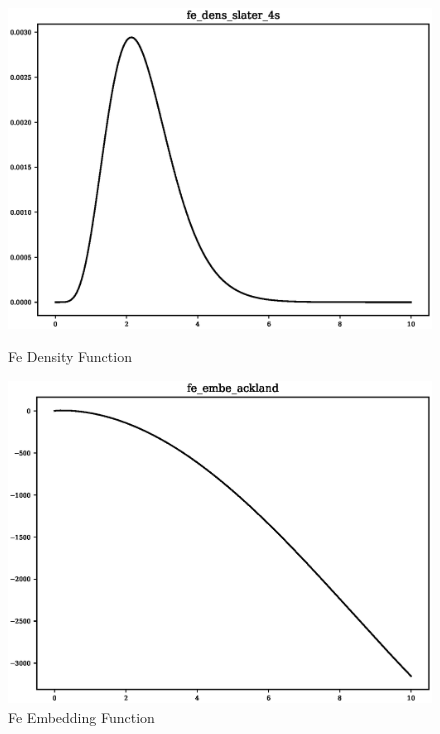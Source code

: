\begin{figure}[ht]
\begin{minipage}[b]{0.5\linewidth}
    \includegraphics[width=.9\linewidth]{chapters/results_potential_fitting/pot_fepd_fcc_2/fe_dens_slater_4s.eps} 
    \caption{Fe Density Function} 
  \end{minipage}%
  \begin{minipage}[b]{0.5\linewidth}
    \centering
    \includegraphics[width=.9\linewidth]{chapters/results_potential_fitting/pot_fepd_fcc_2/fe_embe_ackland.eps} 
    \caption{Fe Embedding Function} 
  \end{minipage} 
  \label{fig:ironFCCPotentialPlots} 
\end{figure}
\FloatBarrier


